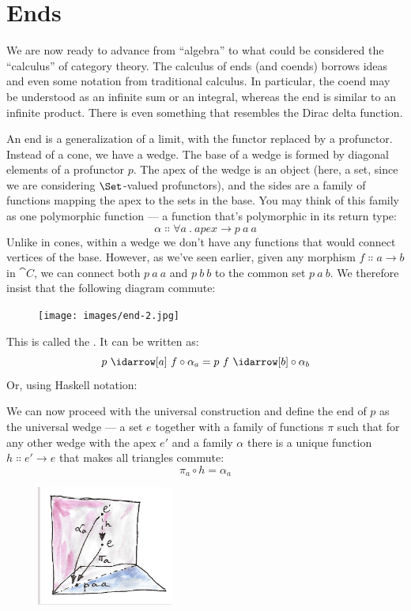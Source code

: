 \section{Ends}

We are now ready to advance from ``algebra'' to what could be considered
the ``calculus'' of category theory. The calculus of ends (and coends)
borrows ideas and even some notation from traditional calculus. In
particular, the coend may be understood as an infinite sum or an
integral, whereas the end is similar to an infinite product. There is
even something that resembles the Dirac delta function.

An end is a generalization of a limit, with the functor replaced by a
profunctor. Instead of a cone, we have a wedge. The base of a wedge is
formed by diagonal elements of a profunctor $p$. The apex of the
wedge is an object (here, a set, since we are considering
$\Set$-valued profunctors), and the sides are a family of
functions mapping the apex to the sets in the base. You may think of
this family as one polymorphic function --- a function that's
polymorphic in its return type:
\[\alpha \Colon \forall a\ .\ \mathit{apex} \to p\ a\ a\]
Unlike in cones, within a wedge we don't have any functions that would
connect vertices of the base. However, as we've seen earlier, given any
morphism $f \Colon a \to b$ in $\cat{C}$, we can connect both
$p\ a\ a$ and $p\ b\ b$ to the common set
$p\ a\ b$. We therefore insist that the following diagram
commute:

\begin{figure}[H]
  \centering
  \texttt{[image: images/end-2.jpg]}
\end{figure}

\noindent
This is called the . It can be written as:
\[p\ \idarrow[a]\ f \circ \alpha_a = p\ f\ \idarrow[b] \circ \alpha_b\]
Or, using Haskell notation:

We can now proceed with the universal construction and define the end of
$p$ as the universal wedge --- a set $e$ together with a
family of functions $\pi$ such that for any other wedge with the
apex $e'$ and a family $\alpha$ there is a unique function
$h \Colon e' \to e$ that makes all triangles commute:
\[\pi_a \circ h = \alpha_a\]

\begin{figure}[H]
  \centering
  \includegraphics[width=0.4\textwidth]{images/end-21.jpg}
\end{figure}

